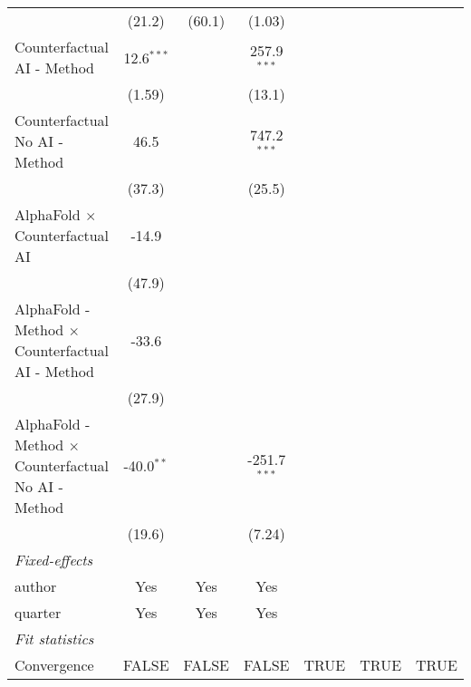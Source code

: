 \begin{tabular}{lcccccc}
                                                              & (21.2)       & (60.1)         & (1.03)         &      &      &   \\   
   Counterfactual AI - Method                                 & 12.6$^{***}$ &                & 257.9$^{***}$  &      &      &   \\   
                                                              & (1.59)       &                & (13.1)         &      &      &   \\   
   Counterfactual No AI - Method                              & 46.5         &                & 747.2$^{***}$  &      &      &   \\   
                                                              & (37.3)       &                & (25.5)         &      &      &   \\   
   AlphaFold $\times$ Counterfactual AI                       & -14.9        &                &                &      &      &   \\   
                                                              & (47.9)       &                &                &      &      &   \\   
   AlphaFold - Method $\times$ Counterfactual AI - Method     & -33.6        &                &                &      &      &   \\   
                                                              & (27.9)       &                &                &      &      &   \\   
   AlphaFold - Method $\times$ Counterfactual No AI - Method  & -40.0$^{**}$ &                & -251.7$^{***}$ &      &      &   \\   
                                                              & (19.6)       &                & (7.24)         &      &      &   \\   
   \midrule
   \emph{Fixed-effects}\\
   author                                                     & Yes          & Yes            & Yes            &      &      & \\  
   quarter                                                    & Yes          & Yes            & Yes            &      &      & \\  
   \midrule
   \emph{Fit statistics}\\
   Convergence                                                &FALSE         & FALSE          & FALSE          & TRUE & TRUE & TRUE\\  

\end{tabular}
